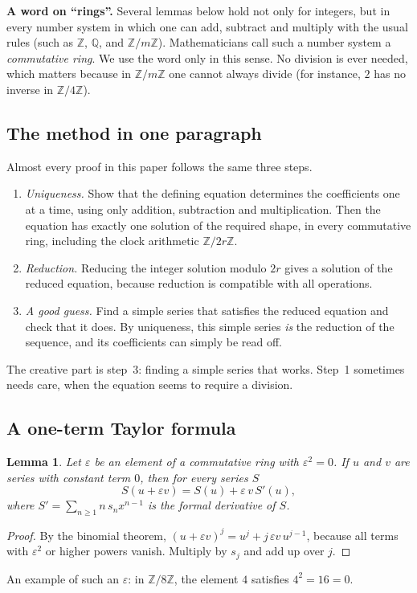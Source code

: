 \documentclass[11pt,a4paper]{article}
\newtheorem{lemma}[theorem]{Lemma}
\theoremstyle{definition}
\theoremstyle{remark}
\newcommand{\Z}{\mathbb{Z}}
\newcommand{\Q}{\mathbb{Q}}
\newcommand{\para}[1]{\par\medskip\noindent\textbf{#1}\enspace}
\begin{document}
\para{A word on ``rings''.} Several lemmas below hold not only for integers, but in every number system in
which one can add, subtract and multiply with the usual rules (such as $\Z$, $\Q$, and $\Z/m\Z$). Mathematicians call
such a number system a \emph{commutative ring}. We use the word only in this sense. No division is ever needed, which
matters because in $\Z/m\Z$ one cannot always divide (for instance, $2$ has no inverse in $\Z/4\Z$).

\subsection{The method in one paragraph}
Almost every proof in this paper follows the same three steps.
\begin{enumerate}
\item \emph{Uniqueness.} Show that the defining equation determines the coefficients one at a time, using only
addition, subtraction and multiplication. Then the equation has exactly one solution of the required shape, in every
commutative ring, including the clock arithmetic $\Z/2r\Z$.
\item \emph{Reduction.} Reducing the integer solution modulo $2r$ gives a solution of the reduced equation,
because reduction is compatible with all operations.
\item \emph{A good guess.} Find a simple series that satisfies the reduced equation and check that it does. By uniqueness,
this simple series \emph{is} the reduction of the sequence, and its coefficients can simply be read off.
\end{enumerate}
The creative part is step~3: finding a simple series that works. Step~1 sometimes needs care, when the equation seems to
require a division.
\subsection{A one-term Taylor formula}
\begin{lemma}\label{lem:taylor}
Let $\varepsilon$ be an element of a commutative ring with $\varepsilon^2=0$. If $u$ and $v$ are series with constant
term $0$, then for every series $S$
\[
S(u+\varepsilon v)=S(u)+\varepsilon\,v\,S'(u),
\]
where $S'=\sum_{n\ge1}n\,s_nx^{n-1}$ is the formal derivative of $S$.
\end{lemma}

\begin{proof}
By the binomial theorem, $(u+\varepsilon v)^j=u^j+j\,\varepsilon v\,u^{j-1}$, because all terms with
$\varepsilon^2$ or higher powers vanish. Multiply by $s_j$ and add up over $j$.
\end{proof}
An example of such an $\varepsilon$: in $\Z/8\Z$, the element $4$ satisfies $4^2=16=0$.
\end{document}

